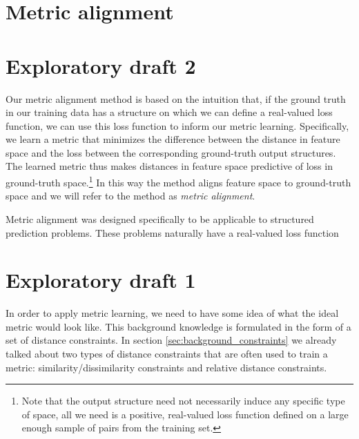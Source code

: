 \section{Metric alignment}


\section*{Exploratory draft 2}

Our metric alignment method is based on the intuition that, if the ground truth in our training data has a structure on which we can define a real-valued loss function, we can use this loss function to inform our metric learning.
Specifically, we learn a metric that minimizes the difference between the distance in feature space and the loss between the corresponding ground-truth output structures.
The learned metric thus makes distances in feature space predictive of loss in ground-truth space.\footnote{Note that the output structure need not necessarily induce any specific type of space, all we need is a positive, real-valued loss function defined on a large enough sample of pairs from the training set.}
In this way the method aligns feature space to ground-truth space and we will refer to the method as \emph{metric alignment}.

Metric alignment was designed specifically to be applicable to structured prediction problems. These problems naturally have a real-valued loss function




\section*{Exploratory draft 1}

In order to apply metric learning, we need to have some idea of what the ideal metric would look like.
This background knowledge is formulated in the form of a set of distance constraints.
In section \ref{sec:background_constraints} we already talked about two types of distance constraints that are often used to train a metric: similarity/dissimilarity constraints and relative distance constraints.

